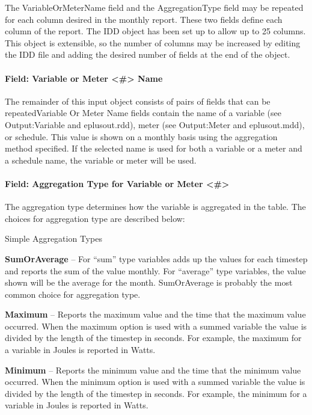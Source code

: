 The VariableOrMeterName field and the AggregationType field may be repeated for each column desired in the monthly report. These two fields define each column of the report. The IDD object has been set up to allow up to 25 columns. This object is extensible, so the number of columns may be increased by editing the IDD file and adding the desired number of fields at the end of the object.

\paragraph{Field: Variable or Meter \textless{}\#\textgreater{} Name}\label{field-variable-or-meter-name-000}

The remainder of this input object consists of pairs of fields that can be repeatedVariable Or Meter Name fields contain the name of a variable (see Output:Variable and eplusout.rdd), meter (see Output:Meter and eplusout.mdd), or schedule. This value is shown on a monthly basis using the aggregation method specified. If the selected name is used for both a variable or a meter and a schedule name, the variable or meter will be used.

\paragraph{Field: Aggregation Type for Variable or Meter \textless{}\#\textgreater{}}\label{field-aggregation-type-for-variable-or-meter-000}

The aggregation type determines how the variable is aggregated in the table. The choices for aggregation type are described below:

Simple Aggregation Types

\textbf{SumOrAverage} -- For ``sum'' type variables adds up the values for each timestep and reports the sum of the value monthly. For ``average'' type variables, the value shown will be the average for the month. SumOrAverage is probably the most common choice for aggregation type.

\textbf{Maximum} -- Reports the maximum value and the time that the maximum value occurred. When the maximum option is used with a summed variable the value is divided by the length of the timestep in seconds. For example, the maximum for a variable in Joules is reported in Watts.

\textbf{Minimum} -- Reports the minimum value and the time that the minimum value occurred. When the minimum option is used with a summed variable the value is divided by the length of the timestep in seconds. For example, the minimum for a variable in Joules is reported in Watts.

